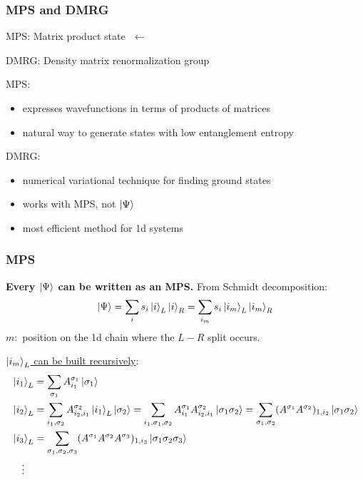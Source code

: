 \documentclass{beamer}
\theoremstyle{definition}
\begin{document}
\begin{frame}
	\frametitle{MPS and DMRG}
	MPS: Matrix product state $\,\,\leftarrow$ \\
	
	\vspace{8pt}
	
	DMRG: Density matrix renormalization group\\
	
	\vspace{8pt}
	
	
	
	\vspace{12pt}
	
	MPS: 
	\begin{itemize}
		\item expresses wavefunctions in terms of products of matrices
		
		\item natural way to generate states with low entanglement entropy
	\end{itemize}

	DMRG:
\textbf{}	\begin{itemize}
		\item numerical variational technique for finding ground states
		
		\item works with MPS, not $\ket{\Psi}$
		
		\item most efficient method for 1d systems
	\end{itemize}
	
	
\end{frame}



\begin{frame}
	\frametitle{MPS}
	\textbf{Every $\ket{\Psi}$ can be written as an MPS.} From Schmidt decomposition:
	\begin{align*}
		\ket{\Psi} = \sum_{i} s_i \ket{i}_L \ket{i}_R = \sum_{i_m} s_i \ket{i_m}_L \ket{i_m}_R
	\end{align*}
	$m:$ position on the 1d chain where the $L-R$ split occurs. \\
	
	\vspace{15pt}
	
	\underline{$\ket{i_m}_L$ can be built recursively}:
	\begin{align*}
		&\ket{i_1}_L = \sum_{\sigma_1}A^{\sigma_1}_{i_1}\ket{\sigma_1}\\
		&\ket{i_2}_L = \sum_{i_1,\sigma_2} A^{\sigma_2}_{i_2,i_1}  \ket{i_1}_L \ket{\sigma_2} = \sum_{i_1,\sigma_1,\sigma_2} A^{\sigma_1}_{i_1}   A^{\sigma_2}_{i_2,i_1} \ket{\sigma_1\sigma_2} = \sum_{\sigma_1,\sigma_2} (A^{\sigma_1}A^{\sigma_2})_{1,i_2} \ket{\sigma_1\sigma_2}\\
		&\ket{i_3}_L = \sum_{\sigma_1,\sigma_2,\sigma_3}(A^{\sigma_1}A^{\sigma_2}A^{\sigma_3})_{1,i_3} \ket{\sigma_1\sigma_2\sigma_3}\\
		&\quad\vdots
	\end{align*}

	
\end{frame}
\end{document}
